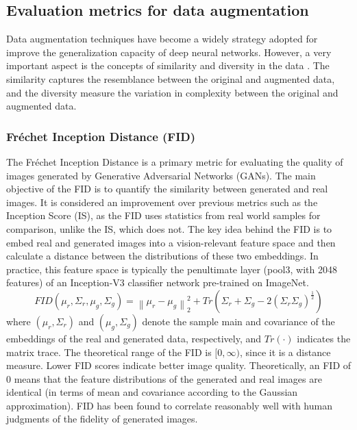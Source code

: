 \documentclass[journal]{IEEEtran}
\begin{document}
\subsection{Evaluation metrics for data augmentation}
Data augmentation techniques have become a widely strategy adopted for improve the generalization capacity of deep neural networks. However, a very important aspect is the concepts of similarity and diversity in the data \cite{yang2024investigating}. The similarity captures the resemblance between the original and augmented data, and the diversity measure the variation in complexity between the original and augmented data.


\subsubsection{Fréchet Inception Distance (FID)}
The Fréchet Inception Distance is a primary metric for evaluating the quality of images generated by Generative Adversarial Networks (GANs)\cite{guven2024image}. The main objective of the FID is to quantify the similarity between generated and real images\cite{heusel2017gans}. It is considered an improvement over previous metrics such as the Inception Score (IS), as the FID uses statistics from real world samples for comparison, unlike the IS, which does not\cite{kynkäänniemi2023roleimagenetclassesfrechet}.
The key idea behind the FID is to embed real and generated images into a vision-relevant feature space and then calculate a distance between the distributions of these two embeddings. In practice, this feature space is typically the penultimate layer (pool3, with 2048 features) of an Inception-V3 classifier network pre-trained on ImageNet\cite{kynkäänniemi2023roleimagenetclassesfrechet}.
\[FID(\mu_r,\Sigma_r,\mu_g,\Sigma_g )=\left\|\mu_r-\mu_g \right\|_2^2+Tr(\Sigma_r+\Sigma_g-2(\Sigma_r \Sigma_g)^{\frac{1}{2}})\]
where $(\mu_r,\Sigma_r)$ and $(\mu_g,\Sigma_g)$ denote the sample main and covariance of the embeddings of the real and generated data, respectively, and $Tr(\cdot)$ indicates the matrix trace\cite{kynkäänniemi2023roleimagenetclassesfrechet}.
The theoretical range of the FID is $[0, \infty)$, since it is a distance measure. Lower FID scores indicate better image quality\cite{wang2019improvingmmdgantrainingrepulsive}. Theoretically, an FID of 0 means that the feature distributions of the generated and real images are identical (in terms of mean and covariance according to the Gaussian approximation)\cite{heusel2017gans}.
FID has been found to correlate reasonably well with human judgments of the fidelity of generated images\cite{heusel2017gans}.
\end{document}
